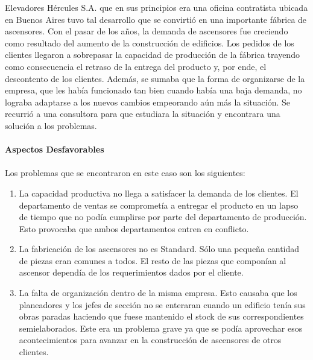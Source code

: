 \documentclass[a4paper,10pt,titlepage]{article}
\begin{document}
		\indent Elevadores H\'ercules S.A. que en sus principios era una oficina contratista ubicada en Buenos Aires tuvo tal desarrollo que se convirti\'o        en una importante f\'abrica de ascensores. Con el pasar de los a\~nos, la demanda de ascensores fue creciendo como resultado del aumento de       la construcci\'on de edificios. Los pedidos de los clientes llegaron a sobrepasar la capacidad de producci\'on de la f\'abrica trayendo como       consecuencia el retraso de la entrega del producto y, por ende, el descontento de los clientes. Adem\'as, se sumaba que la forma de       organizarse de la empresa, que les hab\'ia funcionado tan bien cuando hab\'ia una baja demanda, no lograba adaptarse a los nuevos cambios      empeorando a\'un m\'as la situaci\'on. Se recurri\'o a una consultora para que estudiara la situaci\'on y encontrara una soluci\'on a los problemas. \\ \\

	\textbf{Aspectos Desfavorables}\\\\
		\indent Los problemas que se encontraron en este caso son los siguientes:
		\begin{enumerate}
		  \item La capacidad productiva no llega a satisfacer la demanda de los clientes. El departamento de ventas se compromet\'ia a entregar el 
		  producto en un lapso de tiempo que no pod\'ia cumplirse por parte del departamento de producci\'on. Esto provocaba que ambos departamentos
		  entren en conflicto.
		  \item La fabricaci\'on de los ascensores no es Standard. S\'olo una peque\~na cantidad de piezas eran comunes a todos. El resto de las piezas 
		  que compon\'ian al ascensor depend\'ia de los requerimientos dados por el cliente.
		  \item La falta de organizaci\'on dentro de la misma empresa. Esto causaba que los planeadores y los jefes de secci\'on no se enteraran cuando 
		  un edificio ten\'ia sus obras paradas haciendo que fuese mantenido el stock de sus correspondientes semielaborados. Este era un problema grave 
		  ya que se pod\'ia aprovechar esos acontecimientos para avanzar en la construcci\'on de ascensores de otros clientes.\\
		\end{enumerate}
\end{document}
